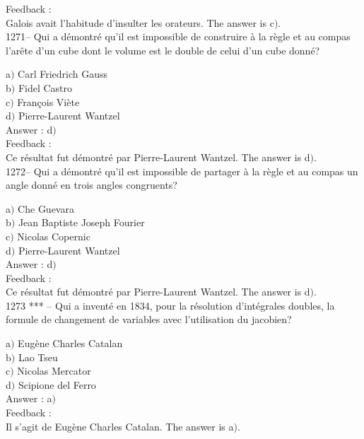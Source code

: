﻿\documentclass[letterpaper, 12pt]{article}
\begin{document}
Feedback : \\
Galois avait l'habitude d'insulter les orateurs.
The answer is c$)$.\\

1271-- Qui a d\'emontr\'e qu'il est impossible de construire \`a la
r\`egle et au compas l'ar\^ete d'un cube dont le volume est le
double de celui d'un cube donn\'e?

a$)$ Carl Friedrich Gauss \\
b$)$ Fidel Castro \\
c$)$ Fran\c cois Vi\`ete \\
d$)$ Pierre-Laurent Wantzel\\

Answer : d$)$\\

Feedback : \\
Ce r\'esultat fut d\'emontr\'e par Pierre-Laurent Wantzel.
The answer is d$)$.\\

1272-- Qui a d\'emontr\'e qu'il est impossible de partager \`a la
r\`egle et au compas un angle donn\'e en trois angles congruents?

a$)$ Che Guevara \\
b$)$ Jean Baptiste Joseph Fourier \\
c$)$ Nicolas Copernic \\
d$)$ Pierre-Laurent Wantzel\\

Answer : d$)$\\

Feedback : \\
Ce r\'esultat fut d\'emontr\'e par Pierre-Laurent Wantzel.
The answer is d$)$.\\

1273 *** -- Qui a invent\'e en 1834, pour la r\'esolution
d'int\'egrales doubles, la formule de changement de variables avec
l'utilisation du jacobien?

a$)$ Eug\`ene Charles Catalan \\
b$)$ Lao Tseu \\
c$)$ Nicolas Mercator \\
d$)$ Scipione del Ferro\\

Answer : a$)$\\

Feedback : \\
Il s'agit de Eug\`ene Charles Catalan.
The answer is a$)$.\\
\end{document}
